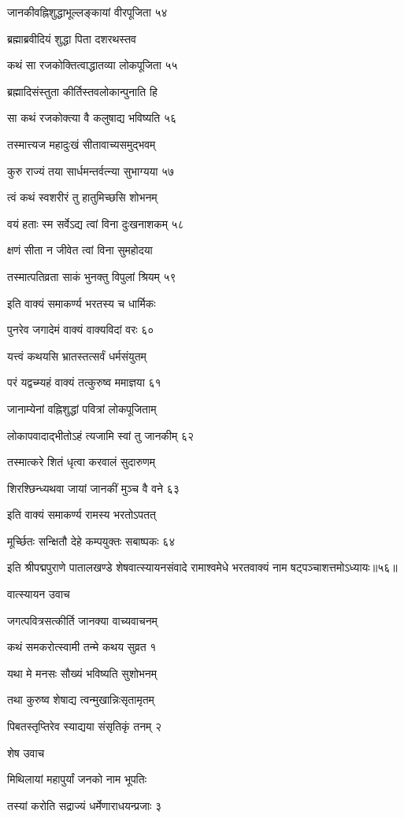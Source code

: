 जानकीवह्निशुद्धाभूल्लङ्कायां वीरपूजिता ५४

ब्रह्माब्रवीदियं शुद्धा पिता दशरथस्तव

कथं सा रजकोक्तित्वाद्धातव्या लोकपूजिता ५५

ब्रह्मादिसंस्तुता कीर्तिस्तवलोकान्पुनाति हि

सा कथं रजकोक्त्या वै कलुषाद्य भविष्यति ५६

तस्मात्त्यज महादुःखं सीतावाच्यसमुद्भवम्

कुरु राज्यं तया सार्धमन्तर्वत्न्या सुभाग्यया ५७

त्वं कथं स्वशरीरं तु हातुमिच्छसि शोभनम्

वयं हताः स्म सर्वेऽद्य त्वां विना दुःखनाशकम् ५८

क्षणं सीता न जीवेत त्वां विना सुमहोदया

तस्मात्पतिव्रता साकं भुनक्तु विपुलां श्रियम् ५९

इति वाक्यं समाकर्ण्य भरतस्य च धार्मिकः

पुनरेव जगादेमं वाक्यं वाक्यविदां वरः ६०

यत्त्वं कथयसि भ्रातस्तत्सर्वं धर्मसंयुतम्

परं यद्वच्म्यहं वाक्यं तत्कुरुष्व ममाज्ञया ६१

जानाम्येनां वह्निशुद्धां पवित्रां लोकपूजिताम्

लोकापवादाद्भीतोऽहं त्यजामि स्वां तु जानकीम् ६२

तस्मात्करे शितं धृत्वा करवालं सुदारुणम्

शिरश्छिन्ध्यथवा जायां जानकीं मुञ्च वै वने ६३

इति वाक्यं समाकर्ण्य रामस्य भरतोऽपतत्

मूर्च्छितः सन्क्षितौ देहे कम्पयुक्तः सबाष्पकः ६४

इति श्रीपद्मपुराणे पातालखण्डे शेषवात्स्यायनसंवादे रामाश्वमेधे भरतवाक्यं नाम षट्पञ्चाशत्तमोऽध्यायः॥५६॥


वात्स्यायन उवाच

जगत्पवित्रसत्कीर्ति जानक्या वाच्यवाचनम्

कथं समकरोत्स्वामी तन्मे कथय सुव्रत १

यथा मे मनसः सौख्यं भविष्यति सुशोभनम्

तथा कुरुष्व शेषाद्य त्वन्मुखान्निःसृतामृतम्

पिबतस्तृप्तिरेव स्याद्यया संसृतिकृं तनम् २

शेष उवाच

मिथिलायां महापुर्यां जनको नाम भूपतिः

तस्यां करोति सद्राज्यं धर्मेणाराधयन्प्रजाः ३

